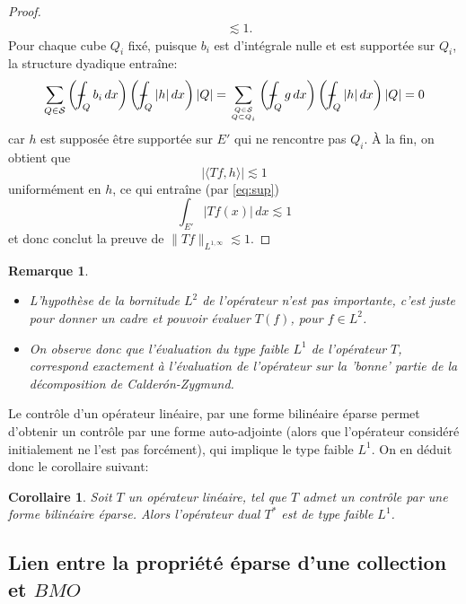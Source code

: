 \documentclass[11pt]{amsart}
\newtheorem{corollary}[theorem]{Corollaire}
\newtheorem*{remark}{Remarque}
\newcommand{\mcS}{{\mathcal S}}
\def\Xint#1{\mathchoice
   {\XXint\displaystyle\textstyle{#1}}%
   {\XXint\textstyle\scriptstyle{#1}}%
   {\XXint\scriptstyle\scriptscriptstyle{#1}}%
   {\XXint\scriptscriptstyle\scriptscriptstyle{#1}}%
   \!\int}
\def\XXint#1#2#3{{\setbox0=\hbox{$#1{#2#3}{\int}$}
     \vcenter{\hbox{$#2#3$}}\kern-.5\wd0}}
\def\aver#1{\Xint-_{#1}}
\begin{document}
\begin{proof}
\begin{align*}
 & \lesssim 1.
\end{align*}
Pour chaque cube $Q_i$ fix\'e, puisque $b_i$ est d'int\'egrale nulle et est support\'ee sur $Q_i$, la structure dyadique entra\^ine:
$$  \sum_{Q\in \mcS} \left(\aver{Q} b_i\, dx \right) \left(\aver{Q} |h|\, dx \right) |Q| =  \sum_{\genfrac{}{}{0pt}{}{Q\in \mcS}{Q\subset Q_i}} \left(\aver{Q} g\, dx \right) \left(\aver{Q} |h|\, dx \right) |Q| = 0$$
car $h$ est suppos\'ee \^etre support\'ee sur $E'$ qui ne rencontre pas $Q_i$.
\`A la fin,  on obtient que
$$ \left| \langle Tf, h \rangle \right| \lesssim 1$$
uniform\'ement en $h$, ce qui entra\^ine (par \eqref{eq:sup}) 
$$ \int_{E'} |Tf(x)|\, dx \lesssim 1$$ et donc conclut la preuve de $\|Tf\|_{L^{1,\infty}} \lesssim 1$.
\end{proof}

\begin{remark}
\begin{itemize}
\item[$\bullet$] L'hypoth\`ese de la bornitude $L^2$ de l'op\'erateur n'est pas importante, c'est juste pour donner un cadre et pouvoir \'evaluer $T(f)$, pour $f\in L^2$.

\item[$\bullet$] On observe donc que l'\'evaluation du type faible $L^1$ de l'op\'erateur $T$, correspond exactement \`a l'\'evaluation de l'op\'erateur sur la 'bonne' partie de la d\'ecomposition de Calder\'on-Zygmund.
\end{itemize}
\end{remark}

Le contr\^ole d'un op\'erateur lin\'eaire, par une forme bilin\'eaire \'eparse permet d'obtenir un contr\^ole par une forme auto-adjointe (alors que l'op\'erateur consid\'er\'e initialement ne l'est pas forc\'ement), qui implique le type faible $L^1$. On en d\'eduit donc le corollaire suivant:

\begin{corollary} \label{coro:typefaible} 
Soit $T$ un op\'erateur lin\'eaire, tel que $T$ admet un contr\^ole par une forme bilin\'eaire \'eparse. Alors l'op\'erateur dual $T^*$ est de type faible $L^1$.
\end{corollary}


\subsection{Lien entre la propri\'et\'e \'eparse d'une collection et $BMO$} 

\end{document}
